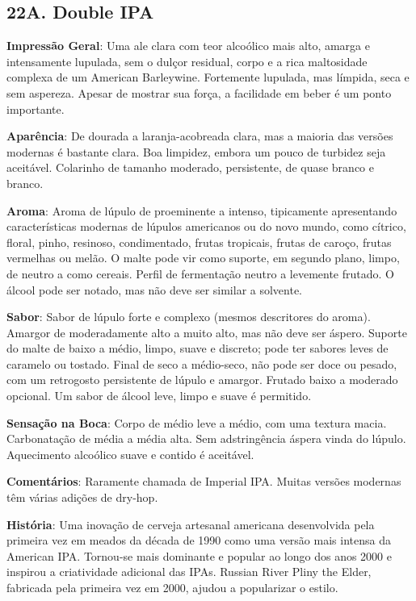 \subsection*{22A. Double IPA}

\textbf{Impressão Geral}: Uma ale clara com teor alcoólico mais alto, amarga e intensamente lupulada, sem o dulçor residual, corpo e a rica maltosidade complexa de um American Barleywine. Fortemente lupulada, mas límpida, seca e sem aspereza. Apesar de mostrar sua força, a facilidade em beber é um ponto importante.

\textbf{Aparência}: De dourada a laranja-acobreada clara, mas a maioria das versões modernas é bastante clara. Boa limpidez, embora um pouco de turbidez seja aceitável. Colarinho de tamanho moderado, persistente, de quase branco e branco.

\textbf{Aroma}: Aroma de lúpulo de proeminente a intenso, tipicamente apresentando características modernas de lúpulos americanos ou do novo mundo, como cítrico, floral, pinho, resinoso, condimentado, frutas tropicais, frutas de caroço, frutas vermelhas ou melão. O malte pode vir como suporte, em segundo plano, limpo, de neutro a como cereais. Perfil de fermentação neutro a levemente frutado. O álcool pode ser notado, mas não deve ser similar a solvente.

\textbf{Sabor}: Sabor de lúpulo forte e complexo (mesmos descritores do aroma). Amargor de moderadamente alto a muito alto, mas não deve ser áspero. Suporte do malte de baixo a médio, limpo, suave e discreto; pode ter sabores leves de caramelo ou tostado. Final de seco a médio-seco, não pode ser doce ou pesado, com um retrogosto persistente de lúpulo e amargor. Frutado baixo a moderado opcional. Um sabor de álcool leve, limpo e suave é permitido.

\textbf{Sensação na Boca}: Corpo de médio leve a médio, com uma textura macia. Carbonatação de média a média alta. Sem adstringência áspera vinda do lúpulo. Aquecimento alcoólico suave e contido é aceitável.

\textbf{Comentários}: Raramente chamada de Imperial IPA. Muitas versões modernas têm várias adições de dry-hop.

\textbf{História}: Uma inovação de cerveja artesanal americana desenvolvida pela primeira vez em meados da década de 1990 como uma versão mais intensa da American IPA. Tornou-se mais dominante e popular ao longo dos anos 2000 e inspirou a criatividade adicional das IPAs. Russian River Pliny the Elder, fabricada pela primeira vez em 2000, ajudou a popularizar o estilo.

